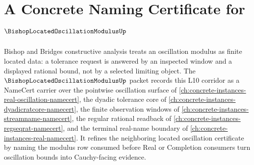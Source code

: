 \chapter{A Concrete Naming Certificate for $\BishopLocatedOscillationModulusUp$}
\label{ch:concrete-instances-bishop-located-oscillation-modulus-namecert}

Bishop and Bridges constructive analysis treats an oscillation modulus as finite located data: a tolerance request is answered by an inspected window and a displayed rational bound, not by a selected limiting object. The $\BishopLocatedOscillationModulusUp$ packet records this L10 corridor as a NameCert carrier over the pointwise oscillation surface of \autoref{ch:concrete-instances-real-oscillation-namecert}, the dyadic tolerance core of \autoref{ch:concrete-instances-dyadicratcore-namecert}, the finite observation windows of \autoref{ch:concrete-instances-streamname-namecert}, the regular rational readback of \autoref{ch:concrete-instances-regseqrat-namecert}, and the terminal real-name boundary of \autoref{ch:concrete-instances-real-namecert}. It refines the neighboring located oscillation certificate by naming the modulus row consumed before Real or Completion consumers turn oscillation bounds into Cauchy-facing evidence.

